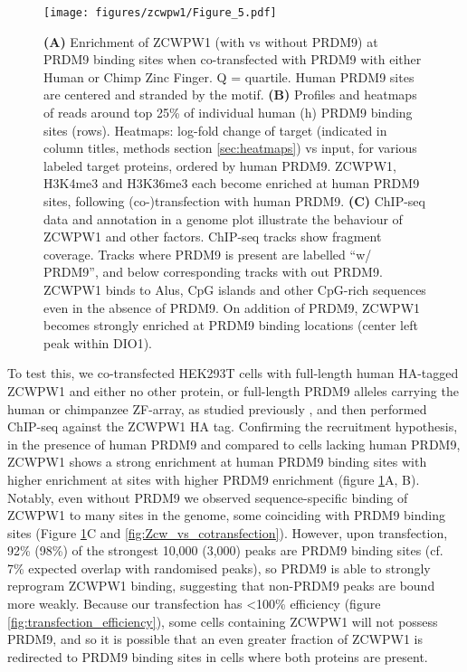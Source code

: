 \begin{figure}[H]
	\centering
	\texttt{[image: figures/zcwpw1/Figure\_5.pdf]}
	\caption[Zcwpw1 Allele Specificity]{
		\textbf{(A)} Enrichment of ZCWPW1 (with vs without PRDM9) at PRDM9 binding sites when co-transfected with PRDM9 with either Human or Chimp Zinc Finger.
		Q = quartile.
		Human PRDM9 sites are centered and stranded by the motif.
		\textbf{(B)} Profiles and heatmaps of reads around top 25\% of individual human (h) PRDM9 binding sites (rows).
			Heatmaps: log-fold change of target (indicated in column titles, methods section \ref{sec:heatmaps}) vs input, for various labeled target proteins, ordered by human PRDM9.
			ZCWPW1, H3K4me3 and H3K36me3 each become enriched at human PRDM9 sites, following (co-)transfection with human PRDM9.
		\textbf{(C)} ChIP-seq data and annotation in a genome plot illustrate the behaviour of ZCWPW1 and other factors.
			ChIP-seq tracks show fragment coverage.
			Tracks where PRDM9 is present are labelled ``w/ PRDM9'', and below corresponding tracks with out PRDM9.
			ZCWPW1 binds to Alus, CpG islands and other CpG-rich sequences even in the absence of PRDM9.
			On addition of PRDM9, ZCWPW1 becomes strongly enriched at PRDM9 binding locations (center left peak within DIO1).
	}
	\label{fig:Allele_Specific}
\end{figure}

To test this, we co-transfected HEK293T cells with full-length human HA-tagged ZCWPW1 and either no other protein, or full-length PRDM9 alleles carrying the human or chimpanzee ZF-array, as studied previously \parencite{Altemose2017map}, and then performed ChIP-seq against the ZCWPW1 HA tag.
Confirming the recruitment hypothesis, in the presence of human PRDM9 and compared to cells lacking human PRDM9, ZCWPW1 shows a strong enrichment at human PRDM9 binding sites with higher enrichment at sites with higher PRDM9 enrichment (figure \ref{fig:Allele_Specific}A, B).
Notably, even without PRDM9 we observed sequence-specific binding of ZCWPW1 to many sites in the genome, some coinciding with PRDM9 binding sites (Figure \ref{fig:Allele_Specific}C and \ref{fig:Zcw_vs_cotransfection}).
However, upon transfection, 92\% (98\%) of the strongest 10,000 (3,000) peaks are PRDM9 binding sites (cf. 7\% expected overlap with randomised peaks), so PRDM9 is able to strongly reprogram ZCWPW1 binding, suggesting that non-PRDM9 peaks are bound more weakly.
Because our transfection has <100\% efficiency (figure \ref{fig:transfection_efficiency}), some cells containing ZCWPW1 will not possess PRDM9, and so it is possible that an even greater fraction of ZCWPW1 is redirected to PRDM9 binding sites in cells where both proteins are present.


